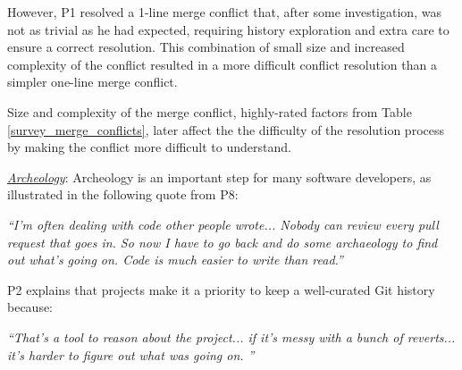 However, P1 resolved a 1-line merge conflict that, after some investigation, was not as trivial as he had expected, requiring history exploration and extra care to ensure a correct resolution. This combination of small size and increased complexity of the conflict resulted in a more difficult conflict resolution than a simpler one-line merge conflict.

\begin{tcolorbox}[enhanced,minipage boxed title,enhanced,title={Takeaway \arabic{takeawaycounter}},
attach boxed title to top left=
{xshift=0mm,yshift=-1mm},
boxed title style={size=small}]
Size and complexity of the merge conflict, highly-rated factors from Table \ref{survey_merge_conflicts}, later affect the the difficulty of the resolution process by making the conflict more difficult to understand.
\end{tcolorbox}
\addtocounter{takeawaycounter}{1}

\underline{\textit{Archeology}}:
Archeology is an important step for many software developers, as illustrated in the following quote from P8:
\begin{displayquote}
\textit{``I'm often dealing with code other people wrote... Nobody can review every pull request that goes in. So now I have to go back and do some archaeology to find out what's going on. Code is much easier to write than read.''}
\end{displayquote}
P2 explains that projects make it a priority to keep a well-curated Git history because:
\begin{displayquote}
\textit{``That's a tool to reason about the project... if it's messy with a bunch of reverts... it's harder to figure out what was going on.	''}
\end{displayquote}

